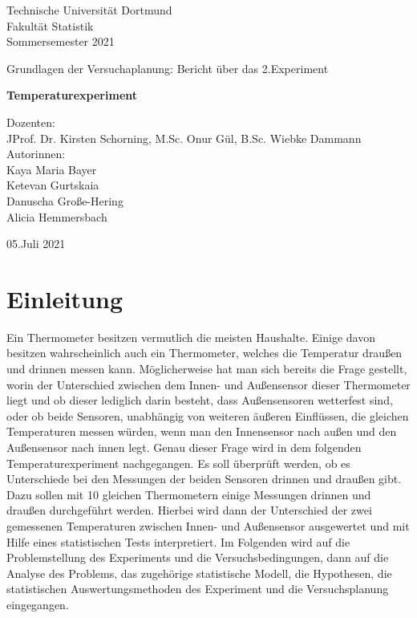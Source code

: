 \documentclass[ ngerman, fontsize= 12pt, paper=a4, headings=big, titlepage=true]{article}
\begin{document}
	
	
\begin{center}
	\Large
	Technische Universität Dortmund\\
	Fakultät Statistik\\
	Sommersemester 2021\\
	
	\vspace{4em}
	
	Grundlagen der Versuchaplanung: Bericht über das 2.Experiment
	
	\Huge
	\textbf{Temperaturexperiment}
	
	\Large
	\vspace{5em}
	Dozenten:\\
	JProf. Dr. Kirsten Schorning, M.Sc. Onur Gül, B.Sc. Wiebke Dammann\\
	
	
	\vspace{8em}
	Autorinnen: \\
	Kaya Maria Bayer\\
	Ketevan Gurtskaia\\
    Danuscha Große-Hering\\	
	Alicia Hemmersbach\\

	
	
	\vspace{12em}
	
	05.Juli 2021
	
\end{center}

\newpage	

\tableofcontents
\newpage

\section{Einleitung}
Ein Thermometer besitzen vermutlich die meisten Haushalte. Einige davon besitzen wahrscheinlich auch ein Thermometer, welches die Temperatur draußen und drinnen messen kann. Möglicherweise hat man sich bereits die Frage gestellt, worin der Unterschied zwischen dem Innen- und Außensensor dieser Thermometer liegt und ob dieser lediglich darin besteht, dass Außensensoren wetterfest sind, oder ob beide Sensoren, unabhängig von weiteren äußeren Einflüssen, die gleichen Temperaturen messen würden, wenn man den Innensensor nach außen und den Außensensor nach innen legt. \newline 
Genau dieser Frage wird in dem folgenden Temperaturexperiment nachgegangen. Es soll überprüft werden, ob es Unterschiede bei den Messungen der beiden Sensoren drinnen und draußen gibt. \newline
Dazu sollen mit 10 gleichen Thermometern einige Messungen drinnen und draußen durchgeführt werden. Hierbei wird dann der Unterschied der zwei gemessenen Temperaturen zwischen Innen- und Außensensor ausgewertet und mit Hilfe eines statistischen Tests interpretiert. \newline 
Im Folgenden wird auf die Problemstellung des Experiments und die Versuchsbedingungen, dann auf die Analyse des Problems, das zugehörige statistische Modell, die Hypothesen, die statistischen Auswertungsmethoden des Experiment und die Versuchsplanung eingegangen.
\end{document}

